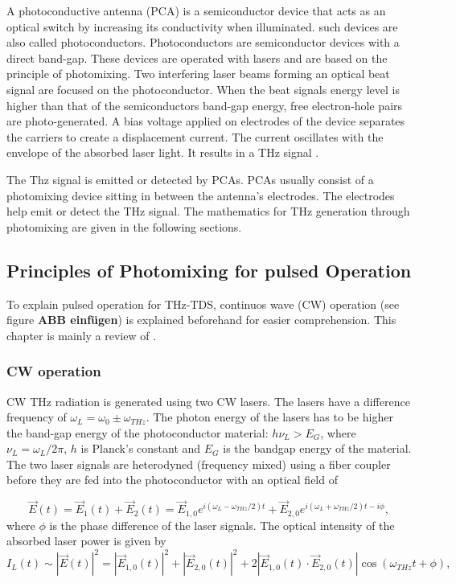 A photoconductive antenna (PCA) is a semiconductor device that acts as an optical switch by increasing its conductivity when illuminated. such devices are also called photoconductors. 
Photoconductors are semiconductor devices with a direct band-gap. These devices are operated with lasers and are based on the principle of photomixing. Two interfering laser beams forming an optical beat signal are focused on the photoconductor. When the beat signals energy level is higher than that of the semiconductors band-gap energy, free electron-hole pairs are photo-generated. A bias voltage applied on electrodes of the device separates the carriers to create a displacement current. The current oscillates with the envelope of the absorbed laser light. It results in a THz signal \cite{nandiErAsInAlGaAsPhotoconductors2021}. 

The Thz signal is emitted or detected by PCAs. PCAs usually consist of a photomixing device sitting in between the antenna's electrodes. The electrodes help emit or detect the THz signal. The mathematics for THz generation through photomixing are given in the following sections.

\subsection{Principles of Photomixing for pulsed Operation}
To explain pulsed operation for THz-TDS, continuos wave (CW) operation (see figure \textbf{ABB einfügen}) is explained beforehand for easier comprehension. This chapter is mainly a review of \cite{nandiErAsInAlGaAsPhotoconductors2021,faridiPulsedFreeSpace2023,preuPrinciplesTHzGeneration2015}.

\subsubsection{CW operation}
CW THz radiation is generated using two CW lasers. The lasers have a difference frequency of $\omega_L = \omega_0 \pm \omega_{THz}$. The photon energy of the lasers has to be higher the band-gap energy of the photoconductor material: $h\nu_L > E_G$, 
where $\nu_L = \omega_L / 2\pi$, $h$ is Planck’s constant and $E_G$ is the bandgap energy of the material. The two laser signals are heterodyned (frequency mixed) using a fiber coupler before they are fed into the photoconductor with an optical field of

\begin{equation}
	\vec{E}(t) = \vec{E}_1(t) + \vec{E}_2(t) = \vec{E}_{1,0}e^{i(\omega_L - \omega_{THz}/2)t} + \vec{E}_{2,0}e^{i(\omega_L + \omega_{THz}/2)t - i\phi},
\end{equation}
where $\phi$ is the phase difference of the laser signals. The optical intensity of the absorbed laser power is given by 
\begin{equation}
	I_L(t) \sim |\vec{E}(t)|^2 = |\vec{E}_{1,0}(t)|^2 + |\vec{E}_{2,0}(t)|^2 + 2|\vec{E}_{1,0}(t) \cdot \vec{E}_{2,0}(t)|\cos(\omega_{THz}t + \phi), 
\end{equation}


